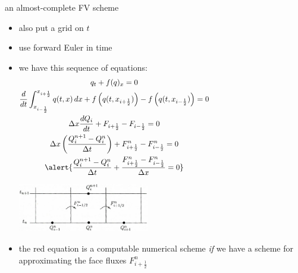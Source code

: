 \documentclass[10pt,dvipsnames,usepdftitle=false,
hyperref={pdftitle = {Finite volume methods},
    pdfauthor = {Ed Bueler}}]{beamer}
\newcommand{\xiphalf}{{x_{i+\frac{1}{2}}}}
\newcommand{\ximhalf}{{x_{i-\frac{1}{2}}}}
\newcommand{\Fiphalf}{{F_{i+\frac{1}{2}}}}
\newcommand{\Fimhalf}{{F_{i-\frac{1}{2}}}}
\newcommand{\Fiphalfn}{{F^n_{i+\frac{1}{2}}}}
\newcommand{\Fimhalfn}{{F^n_{i-\frac{1}{2}}}}
\begin{document}
\begin{frame}{an almost-complete FV scheme}

\begin{itemize}
\item also put a grid on $t$
\item use forward Euler in time
\item we have this sequence of equations:
\small
\begin{gather*}
q_t + f(q)_x = 0 \hspace{50mm} \\
\frac{d}{dt} \int_\ximhalf^\xiphalf q(t,x) \,dx + f\left(q(t,\xiphalf)\right) - f\left(q(t,\ximhalf)\right) = 0 \hspace{50mm} \\
\Delta x \frac{dQ_i}{dt} + \Fiphalf - \Fimhalf = 0 \hspace{50mm} \\
\Delta x \left(\frac{Q_i^{n+1} - Q_i^n}{\Delta t}\right) + \Fiphalfn - \Fimhalfn = 0 \hspace{50mm} \\
\alert{\frac{Q_i^{n+1} - Q_i^n}{\Delta t} + \frac{\Fiphalfn - \Fimhalfn}{\Delta x} = 0} \hspace{50mm}
\end{gather*}

\vspace{-15mm}

\hfill \includegraphics[width=0.45\textwidth]{figs/leveque4p1}

\normalsize
\medskip
\item the \alert{red equation} is a computable numerical scheme \emph{if} we have a scheme for approximating the face fluxes $\Fiphalfn$
\end{itemize}
\end{frame}
\end{document}

